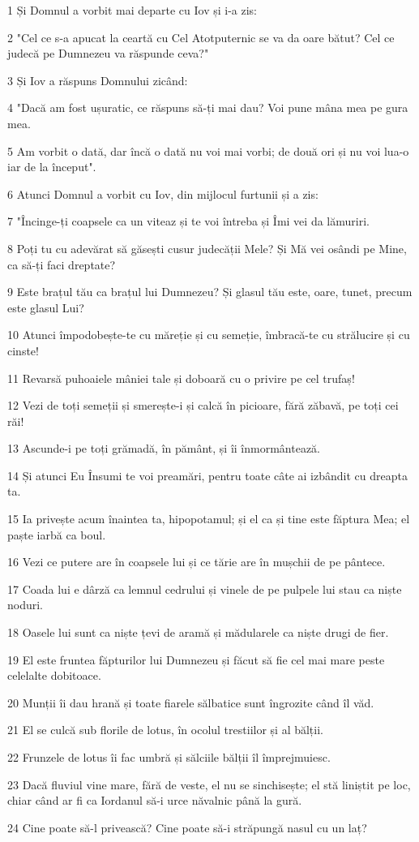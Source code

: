 \par 1 Și Domnul a vorbit mai departe cu Iov și i-a zis:
\par 2 "Cel ce s-a apucat la ceartă cu Cel Atotputernic se va da oare bătut? Cel ce judecă pe Dumnezeu va răspunde ceva?"
\par 3 Și Iov a răspuns Domnului zicând:
\par 4 "Dacă am fost ușuratic, ce răspuns să-ți mai dau? Voi pune mâna mea pe gura mea.
\par 5 Am vorbit o dată, dar încă o dată nu voi mai vorbi; de două ori și nu voi lua-o iar de la început".
\par 6 Atunci Domnul a vorbit cu Iov, din mijlocul furtunii și a zis:
\par 7 "Încinge-ți coapsele ca un viteaz și te voi întreba și Îmi vei da lămuriri.
\par 8 Poți tu cu adevărat să găsești cusur judecății Mele? Și Mă vei osândi pe Mine, ca să-ți faci dreptate?
\par 9 Este brațul tău ca brațul lui Dumnezeu? Și glasul tău este, oare, tunet, precum este glasul Lui?
\par 10 Atunci împodobește-te cu măreție și cu semeție, îmbracă-te cu strălucire și cu cinste!
\par 11 Revarsă puhoaiele mâniei tale și doboară cu o privire pe cel trufaș!
\par 12 Vezi de toți semeții și smerește-i și calcă în picioare, fără zăbavă, pe toți cei răi!
\par 13 Ascunde-i pe toți grămadă, în pământ, și îi înmormântează.
\par 14 Și atunci Eu Însumi te voi preamări, pentru toate câte ai izbândit cu dreapta ta.
\par 15 Ia privește acum înaintea ta, hipopotamul; și el ca și tine este făptura Mea; el paște iarbă ca boul.
\par 16 Vezi ce putere are în coapsele lui și ce tărie are în mușchii de pe pântece.
\par 17 Coada lui e dârză ca lemnul cedrului și vinele de pe pulpele lui stau ca niște noduri.
\par 18 Oasele lui sunt ca niște țevi de aramă și mădularele ca niște drugi de fier.
\par 19 El este fruntea făpturilor lui Dumnezeu și făcut să fie cel mai mare peste celelalte dobitoace.
\par 20 Munții îi dau hrană și toate fiarele sălbatice sunt îngrozite când îl văd.
\par 21 El se culcă sub florile de lotus, în ocolul trestiilor și al bălții.
\par 22 Frunzele de lotus îi fac umbră și sălciile bălții îl împrejmuiesc.
\par 23 Dacă fluviul vine mare, fără de veste, el nu se sinchisește; el stă liniștit pe loc, chiar când ar fi ca Iordanul să-i urce năvalnic până la gură.
\par 24 Cine poate să-l privească? Cine poate să-i străpungă nasul cu un laț?


